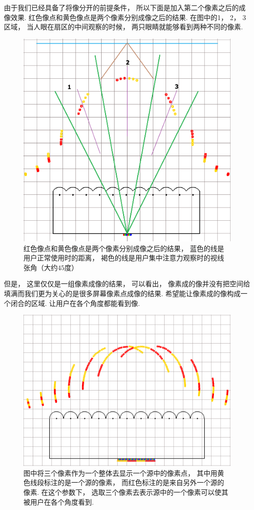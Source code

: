 \documentclass[12pt,a4paper]{article}
\begin{document}
由于我们已经具备了将像分开的前提条件， 所以下面是加入第二个像素之后的成像效果. 红色像点和黄色像点是两个像素分别成像之后的结果. 在图中的1， 2， 3区域， 当人眼在扇区的中间观察的时候， 两只眼睛就能够看到两种不同的像素.
\begin{figure}[h!]
    \centering\includegraphics[width=0.8\linewidth]{217}
    \caption{红色像点和黄色像点是两个像素分别成像之后的结果， 蓝色的线是用户正常使用时的距离， 褐色的线是用户集中注意力观察时的视线张角（大约$45$度）}
\end{figure}

但是， 这里仅仅是一组像素成像的结果， 可以看出， 像素成的像并没有把空间给填满而我们更为关心的是很多屏幕像素点成像的结果. 希望能让像素成的像构成一个闭合的区域. 让用户在各个角度都能看到像.
\begin{figure}[h!]
    \centering\includegraphics[width=0.8\linewidth]{223}
    \caption{图中将三个像素作为一个整体去显示一个源中的像素点， 其中用黄色线段标注的是一个源的像素， 而红色标注的是来自另外一个源的像素. 在这个参数下， 选取三个像素去表示源中的一个像素可以使其被用户在各个角度看到.}
\end{figure}
\end{document}
